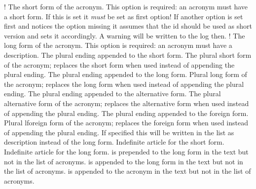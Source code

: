 \documentclass[load-preamble+]{cnltx-doc}
\begin{document}
\begin{options}
  \Default!
    The short form of the acronym.  This option is required: an acronym must
    have a short form.  If this is set it \emph{must} be set as first option!
    If another option is set first and notices the  option
    missing it assumes that the \acs{id} should be used as short version and
    sets it accordingly.  A warning will be written to the log then.
  \Default!
    The long form of the acronym.  This option is required: an acronym must
    have a description.
    The plural ending appended to the short form.
    The plural short form of the acronym; replaces the short
    form when used instead of appending the plural ending.
    The plural ending appended to the long form.
    Plural long form of the acronym; replaces the long form when used
    instead of appending the plural ending.
    The plural ending appended to the alternative form.
    The plural alternative form of the acronym; replaces the
    alternative form when used instead of appending the plural ending.
    The plural ending appended to the foreign form.
    Plural lforeign form of the acronym; replaces the
    foreign form when used instead of appending the plural ending.
    If specified this will be written in the list as description instead of
    the long form.
    Indefinite article for the short form.
    Indefinite article for the long form.
     is prepended to the long form in the text but not in the list
    of acronyms.
     is appended to the long form in the text but not in the list
    of acronyms.
     is appended to the acronym in the text but
    not in the list of acronyms.

\end{options}
\end{document}
